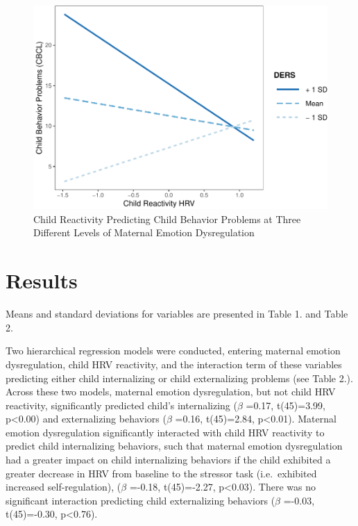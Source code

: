 \documentclass[man]{apa6}
\begin{document}
\begin{figure}
\centering
\includegraphics{DataPrepScript_apa_style_files/figure-latex/plot3-1.pdf}
\caption{\label{fig:plot3}Child Reactivity Predicting Child Behavior
Problems at Three Different Levels of Maternal Emotion Dysregulation}
\end{figure}

\section{Results}\label{results}

Means and standard deviations for variables are presented in Table 1.
and Table 2.

Two hierarchical regression models were conducted, entering maternal
emotion dysregulation, child HRV reactivity, and the interaction term of
these variables predicting either child internalizing or child
externalizing problems (see Table 2.). Across these two models, maternal
emotion dysregulation, but not child HRV reactivity, significantly
predicted child's internalizing (\(\beta\) =0.17, t(45)=3.99,
p\textless{}0.00) and externalizing behaviors (\(\beta\) =0.16,
t(45)=2.84, p\textless{}0.01). Maternal emotion dysregulation
significantly interacted with child HRV reactivity to predict child
internalizing behaviors, such that maternal emotion dysregulation had a
greater impact on child internalizing behaviors if the child exhibited a
greater decrease in HRV from baseline to the stressor task
(i.e.~exhibited increased self-regulation), (\(\beta\) =-0.18,
t(45)=-2.27, p\textless{}0.03). There was no significant interaction
predicting child externalizing behaviors (\(\beta\) =-0.03, t(45)=-0.30,
p\textless{}0.76).
\end{document}
